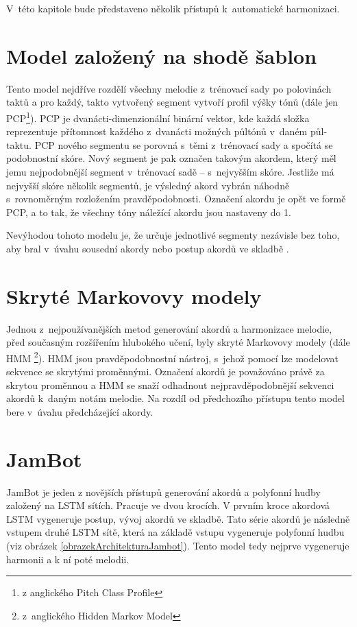 V~této kapitole bude představeno několik přístupů k~automatické harmonizaci.

\section{Model založený na shodě šablon}
\label{shodaSablon}
Tento model nejdříve rozdělí všechny melodie z~trénovací sady po polovinách taktů 
a pro každý, takto vytvořený segment vytvoří profil výšky tónů 
(dále jen PCP\footnote{z anglického Pitch Class Profile}).
\cite{YinCheng_comparativeStudy}
PCP je dvanácti-dimenzionální binární vektor, 
kde každá složka reprezentuje přítomnost 
každého z~dvanácti možných půltónů v~daném půl-taktu.
\cite{fujishima}
PCP nového segmentu se porovná s~těmi z~trénovací sady
a spočítá se podobnostní skóre.
Nový segment je pak označen takovým akordem,
který měl jemu nejpodobnější segment v~trénovací sadě -- s~nejvyšším skóre.
Jestliže má nejvyšší skóre několik segmentů,
je výsledný akord vybrán náhodně s~rovnoměrným rozložením pravděpodobnosti.
Označení akordu je opět ve formě PCP, a to tak,
že všechny tóny náležící akordu jsou nastaveny do 1.
\par

Nevýhodou tohoto modelu je, že určuje jednotlivé segmenty nezávisle bez toho,
aby bral v~úvahu sousední akordy nebo postup akordů ve skladbě
\cite{YinCheng_comparativeStudy}.

\section{Skryté Markovovy modely}
Jednou z~nejpoužívanějších metod generování akordů a harmonizace melodie, 
před současným rozšířením hlubokého učení, byly skryté Markovovy modely 
(dále HMM \footnote{z~anglického Hidden Markov Model}).
HMM jsou pravděpodobnostní nástroj, 
s~jehož pomocí lze modelovat sekvence se skrytými proměnnými.
Označení akordů je považováno právě za skrytou proměnnou a 
HMM se snaží odhadnout nejpravděpodobnější sekvenci akordů
k~daným notám melodie.
Na rozdíl od předchozího přístupu 
tento model bere v~úvahu předcházející akordy.
\cite{YinCheng_comparativeStudy}

\section{JamBot}
\label{Jambot}
JamBot \cite{Brunner_Jambot} je jeden z novějších přístupů generování akordů 
a polyfonní hudby založený na LSTM sítích.
Pracuje ve dvou krocích.
V prvním kroce akordová LSTM vygeneruje postup, vývoj akordů ve skladbě.
Tato série akordů je následně vstupem druhé LSTM sítě,
která na základě vstupu vygeneruje polyfonní hudbu (viz obrázek \ref{obrazekArchitekturaJambot}).
Tento model tedy nejprve vygeneruje harmonii a k ní poté melodii.
\par

